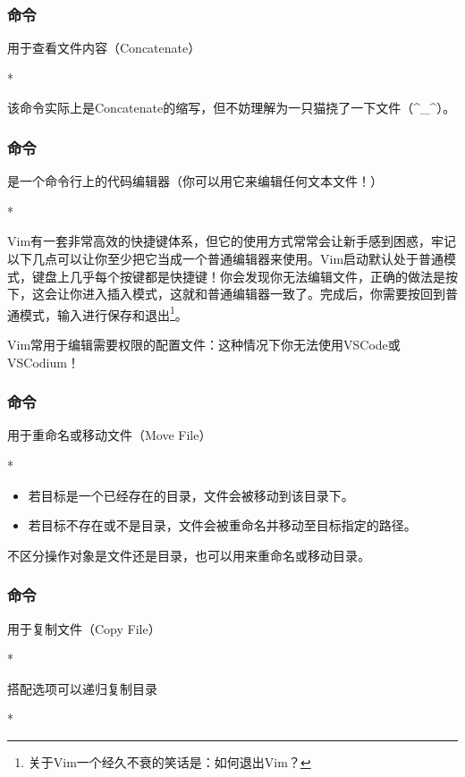 \begin{frame}
    \frametitle{命令}
    用于查看文件内容（Concatenate）
    \begin{Code}*
        
    \end{Code}
    该命令实际上是Concatenate的缩写，但不妨理解为一只猫挠了一下文件（\^{}\_\^{}）。
\end{frame}

\begin{frame}
    \frametitle{命令}
    是一个命令行上的代码编辑器（你可以用它来编辑任何文本文件！）
    \begin{Code}*
        
    \end{Code}
    Vim有一套非常高效的快捷键体系，但它的使用方式常常会让新手感到困惑，牢记以下几点可以让你至少把它当成一个普通编辑器来使用。Vim启动默认处于普通模式，键盘上几乎每个按键都是快捷键！你会发现你无法编辑文件，正确的做法是按下，这会让你进入插入模式，这就和普通编辑器一致了。完成后，你需要按回到普通模式，输入进行保存和退出\footnote{关于Vim一个经久不衰的笑话是：如何退出Vim？}。

    Vim常用于编辑需要权限的配置文件：这种情况下你无法使用VSCode或VSCodium！
\end{frame}

\begin{frame}
    \frametitle{命令}
    用于重命名或移动文件（Move File）
    \begin{Code}*
        
    \end{Code}
    \begin{itemize}
        \item 若目标是一个已经存在的目录，文件会被移动到该目录下。
        \item 若目标不存在或不是目录，文件会被重命名并移动至目标指定的路径。
    \end{itemize}
    不区分操作对象是文件还是目录，也可以用来重命名或移动目录。
\end{frame}

\begin{frame}
    \frametitle{命令}
    用于复制文件（Copy File）
    \begin{Code}*
        
    \end{Code}
    搭配选项可以递归复制目录
    \begin{Code}*
        
    \end{Code}
\end{frame}

